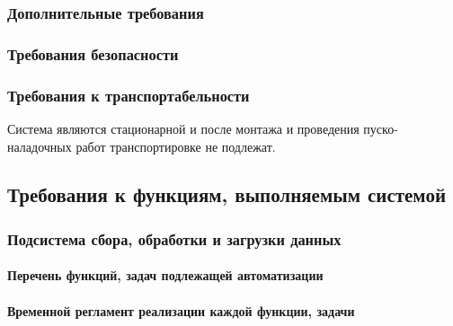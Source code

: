 \documentclass[a4paper, 12pt]{article}		%
\begin{document}
\subsubsection{Дополнительные требования}


\subsubsection{Требования безопасности}



\subsubsection{Требования к транспортабельности}

Система являются стационарной и после монтажа и проведения пуско-наладочных работ транспортировке не подлежат.

\subsection{Требования к функциям, выполняемым системой}


\subsubsection{Подсистема сбора, обработки и загрузки данных}
\paragraph{Перечень функций, задач подлежащей автоматизации\\}


\paragraph{Временной регламент реализации каждой функции, задачи\\}
\end{document}

